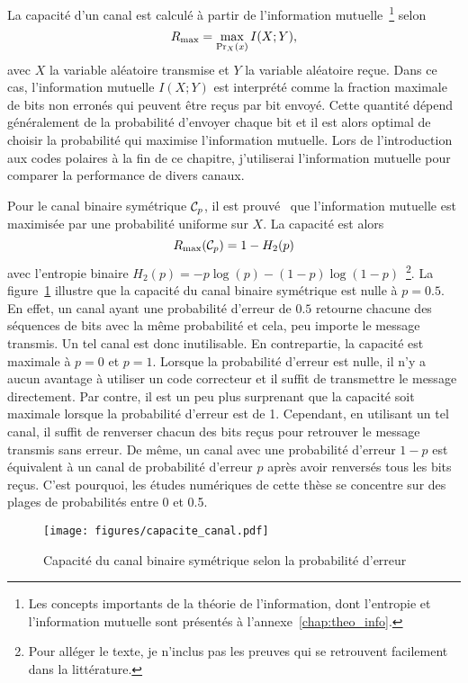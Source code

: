 La capacité d'un canal est calculé à partir de l'information mutuelle~\footnote{
  Les concepts importants de la théorie de l'information, dont l'entropie
  et l'information mutuelle sont présentés à l'annexe~\ref{chap:theo_info}.
} 
selon
\begin{equation}
  R_{\text{max}} = \max_{\Pr_X(x)} I(X ; Y),
\end{equation}
avec $X$ la variable aléatoire transmise et $Y$ la variable aléatoire reçue.
Dans ce cas,
l'information mutuelle $I(X ; Y)$ est interprété comme la fraction maximale
de bits non erronés qui peuvent être reçus par bit envoyé.
Cette quantité dépend généralement de la probabilité d'envoyer chaque bit
et il est alors optimal de choisir la probabilité qui maximise l'information mutuelle.
Lors de l'introduction aux codes polaires à la fin de ce chapitre,
j'utiliserai l'information mutuelle pour comparer la performance de divers canaux.

Pour le canal binaire symétrique $\mathcal{C}_p$, 
il est prouvé~\cite{shannon_mathematical_1948} que l'information mutuelle
est maximisée par une probabilité uniforme sur $X$. 
La capacité est alors
\begin{equation}
  R_{\text{max}}(\mathcal{C}_p) = 1 - H_2(p)
\end{equation}
avec l'entropie binaire $H_2(p) = -p \log(p) - (1 - p)\log(1 - p)$~\footnote{
  Pour alléger le texte, je n'inclus pas les preuves qui se retrouvent facilement 
  dans la littérature.
}. 
La figure~\ref{fig:capacite_canal} illustre que la capacité du canal binaire symétrique 
est nulle à $p = 0.5$.
En effet, un canal ayant une probabilité d'erreur de $0.5$ retourne 
chacune des séquences de bits avec la même probabilité 
et cela, peu importe le message transmis.
Un tel canal est donc inutilisable.
En contrepartie, la capacité est maximale à $p = 0$ et $p = 1$.
Lorsque la probabilité d'erreur est nulle,
il n'y a aucun avantage à utiliser un code correcteur 
et il suffit de transmettre le message directement.
Par contre, il est un peu plus surprenant que la capacité soit maximale lorsque la probabilité
d'erreur est de 1.
Cependant, en utilisant un tel canal, 
il suffit de renverser chacun des bits reçus pour retrouver le message transmis sans erreur.
De même, 
un canal avec une probabilité d'erreur $1 - p$ est équivalent à un canal de probabilité d'erreur $p$
après avoir renversés tous les bits reçus.
C'est pourquoi, 
les études numériques de cette thèse se concentre sur des plages de probabilités entre 0 et 0.5.

\begin{figure}
  \begin{center}
    \texttt{[image: figures/capacite\_canal.pdf]}
  \end{center}
  \caption[Capacité du canal binaire symétrique]{
    Capacité du canal binaire symétrique selon la probabilité d'erreur
  }
  \label{fig:capacite_canal}
\end{figure}

